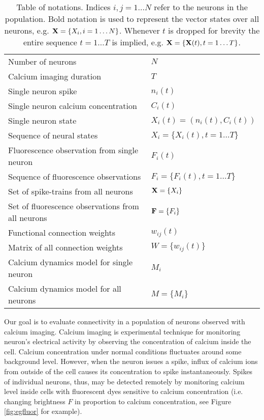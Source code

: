 \begin{table}[h!b!p!]
\caption{Table of notations. Indices $i, j=1\ldots N$ refer to the neurons in the population. Bold notation is used to represent the vector states over all neurons, e.g. ${\bf X}=\{X_i, i=1\ldots N\}$. Whenever $t$ is dropped for brevity the entire sequence $t=1\ldots T$ is implied, e.g. ${\bf X}=\{{\bf X}(t), t=1\ldots T\}$.}
\label{table:notation}
\begin{tabular}{ll}
Number of neurons         & $N$ \\
Calcium imaging duration & $T$ \\
Single neuron spike & $n_i(t)$ \\
Single neuron calcium concentration & $C_i(t)$ \\
Single neuron state & $X_i(t)=(n_i(t), C_i(t))$ \\
Sequence of neural states & $X_i=\{X_i(t), t=1\ldots T\}$ \\
Fluorescence observation from single neuron & $F_i(t)$ \\
Sequence of fluorescence observations & $F_i=\{F_i(t), t=1\ldots T\}$ \\
Set of spike-trains from all neurons   & ${\bf X}=\{X_i\}$ \\
Set of fluorescence observations from all neurons & ${\bf F}=\{F_i\}$ \\
Functional connection weights & $w_{ij}(t)$ \\
Matrix of all connection weights & $W=\{w_{ij}(t)\}$ \\
Calcium dynamics model for single neuron & $M_i$ \\
Calcium dynamics model for all neurons & $M=\{M_i\}$
\end{tabular}
\end{table}

Our goal is to evaluate connectivity in a population of neurons observed with calcium imaging.  Calcium imaging is experimental technique for monitoring neuron's electrical activity  by observing the concentration of calcium inside the cell.  Calcium concentration under normal conditions fluctuates around some background level. However, when the neuron issues a spike, influx of calcium ions from outside of the cell causes its concentration to spike instantaneously.  Spikes of individual neurons, thus, may be detected remotely by monitoring calcium level inside cells with fluorescent dyes sensitive to calcium concentration (i.e. changing brightness $F$ in proportion to calcium concentration, see Figure \ref{fig:egfluor} for example).


